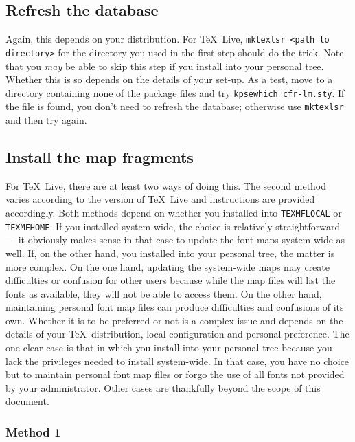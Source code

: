 \documentclass[11pt,british]{article}
\begin{document}
\subsection{Refresh the database}

Again, this depends on your distribution. For \TeX~Live, \verb|mktexlsr <path to directory>| for the directory you used in the first step should do the trick. Note that you \emph{may} be able to skip this step if you install into your personal tree. Whether this is so depends on the details of your set-up. As a test, move to a directory containing none of the package files and try \verb|kpsewhich cfr-lm.sty|. If the file is found, you don't need to refresh the database; otherwise use \verb|mktexlsr| and then try again.

\subsection{Install the map fragments}

For \TeX~Live, there are at least two ways of doing this. The second method varies according to the version of \TeX~Live and instructions are provided accordingly. Both methods depend on whether you installed into \verb|TEXMFLOCAL| or \verb|TEXMFHOME|. If you installed system-wide, the choice is relatively straightforward --- it obviously makes sense in that case to update the font maps system-wide as well. If, on the other hand, you installed into your personal tree, the matter is more complex. On the one hand, updating the system-wide maps may create difficulties or confusion for other users because while the map files will list the fonts as available, they will not be able to access them. On the other hand, maintaining personal font map files can produce difficulties and confusions of its own. Whether it is to be preferred or not is a complex issue and depends on the details of your \TeX\ distribution, local configuration and personal preference. The one clear case is that in which you install into your personal tree because you lack the privileges needed to install system-wide. In that case, you have no choice but to maintain personal font map files or forgo the use of all fonts not provided by your administrator. Other cases are thankfully beyond the scope of this document.

\subsubsection{Method 1}
\end{document}
